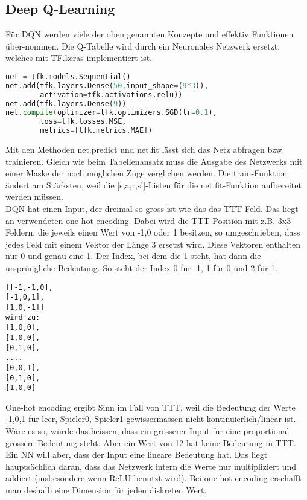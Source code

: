 \documentclass[12pt,a4paper]{article}
\begin{document}
\subsection{Deep Q-Learning}

Für DQN werden viele der oben genannten Konzepte und effektiv Funktionen über-nommen. Die Q-Tabelle wird durch ein Neuronales Netzwerk ersetzt, welches mit TF.keras implementiert ist.
\begin{singlespace}
\begin{lstlisting}[language=Python,caption={Beispiel für das Erstellen eines Netzwerks mit zwei dense(aka normalen)-Schichten},captionpos=b]
net = tfk.models.Sequential()
net.add(tfk.layers.Dense(50,input_shape=(9*3)),
		activation=tfk.activations.relu))
net.add(tfk.layers.Dense(9))
net.compile(optimizer=tfk.optimizers.SGD(lr=0.1),
        loss=tfk.losses.MSE,
        metrics=[tfk.metrics.MAE])
\end{lstlisting}
\end{singlespace}

Mit den Methoden net.predict und net.fit lässt sich das Netz abfragen bzw. trainieren. Gleich wie beim Tabellenansatz muss die Ausgabe des Netzwerks mit einer Maske der noch möglichen Züge verglichen werden. Die train-Funktion ändert am Stärksten, weil die [s,a,r,s']-Listen für die net.fit-Funktion aufbereitet werden müssen.\\
DQN hat einen Input, der dreimal so gross ist wie das das TTT-Feld. Das liegt an verwendeten one-hot encoding. Dabei wird die TTT-Position mit z.B. 3x3 Feldern, die jeweils einen Wert von -1,0 oder 1 besitzen, so umgeschrieben, dass jedes Feld mit einem Vektor der Länge 3 ersetzt wird. Diese Vektoren enthalten nur 0 und genau eine 1. Der Index, bei dem die 1 steht, hat dann die ursprüngliche Bedeutung. So steht der Index 0 für -1, 1 für 0 und 2 für 1.

\begin{lstlisting}
[[-1,-1,0],
[-1,0,1],
[1,0,-1]]
wird zu:
[1,0,0],
[1,0,0],
[0,1,0],
....
[0,0,1],
[0,1,0],
[1,0,0]
\end{lstlisting}

One-hot encoding ergibt Sinn im Fall von TTT, weil die Bedeutung der Werte -1,0,1 für leer, Spieler0, Spieler1 gewissermassen nicht kontinuierlich/linear ist. Wäre es so, würde das heissen, dass ein grösserer Input für eine proportional grössere Bedeutung steht. Aber ein Wert von 12 hat keine Bedeutung in TTT.
Ein NN will aber, dass der Input eine lineare Bedeutung hat. Das liegt hauptsächlich daran, dass das Netzwerk intern die Werte nur multipliziert und addiert (insbesondere wenn ReLU benutzt wird).
Bei one-hot encoding erschafft man deshalb eine Dimension für jeden diskreten Wert.\\
\end{document}
